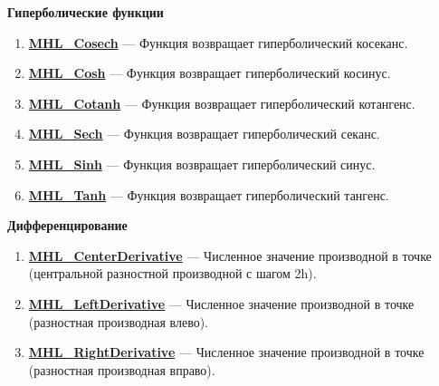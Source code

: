\documentclass[a4paper,12pt]{article}
\begin{document}
\textbf{Гиперболические функции}
\begin{enumerate}

\item \textbf{\hyperref[MHL_Cosech]{MHL\_Cosech}} --- Функция возвращает гиперболический косеканс.

\item \textbf{\hyperref[MHL_Cosh]{MHL\_Cosh}} --- Функция возвращает гиперболический косинус.

\item \textbf{\hyperref[MHL_Cotanh]{MHL\_Cotanh}} --- Функция возвращает гиперболический котангенс.

\item \textbf{\hyperref[MHL_Sech]{MHL\_Sech}} --- Функция возвращает гиперболический секанс.

\item \textbf{\hyperref[MHL_Sinh]{MHL\_Sinh}} --- Функция возвращает гиперболический синус.

\item \textbf{\hyperref[MHL_Tanh]{MHL\_Tanh}} --- Функция возвращает гиперболический тангенс.

\end{enumerate}

\textbf{Дифференцирование}
\begin{enumerate}

\item \textbf{\hyperref[MHL_CenterDerivative]{MHL\_CenterDerivative}} --- Численное значение производной в точке (центральной разностной производной с шагом 2h).

\item \textbf{\hyperref[MHL_LeftDerivative]{MHL\_LeftDerivative}} --- Численное значение производной в точке (разностная производная влево).

\item \textbf{\hyperref[MHL_RightDerivative]{MHL\_RightDerivative}} --- Численное значение производной в точке (разностная производная вправо).

\end{enumerate}
\end{document}

